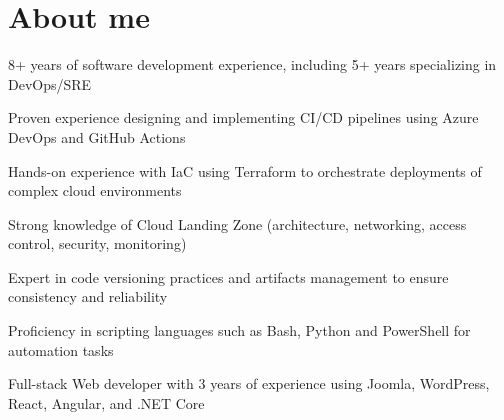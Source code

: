 \documentclass[]{deedy-resume-openfont}
\begin{document}
    
%
%
%
%
\sectionsep
\sectionsep
\section{About me}
\vspace{5pt}
\begin{tightemize}
	\item 8+ years of software development experience, including 5+ years specializing in DevOps/SRE
	\item Proven experience designing and implementing CI/CD pipelines using Azure DevOps and GitHub Actions
	\item Hands-on experience with IaC using Terraform to orchestrate deployments of complex cloud environments
	\item Strong knowledge of Cloud Landing Zone (architecture, networking, access control, security, monitoring)
	\item Expert in code versioning practices and artifacts management to ensure consistency and reliability
	\item Proficiency in scripting languages such as Bash, Python and PowerShell for automation tasks
	\item Full-stack Web developer with 3 years of experience using Joomla, WordPress, React, Angular, and .NET Core
\end{tightemize}
%
%
\end{document}
